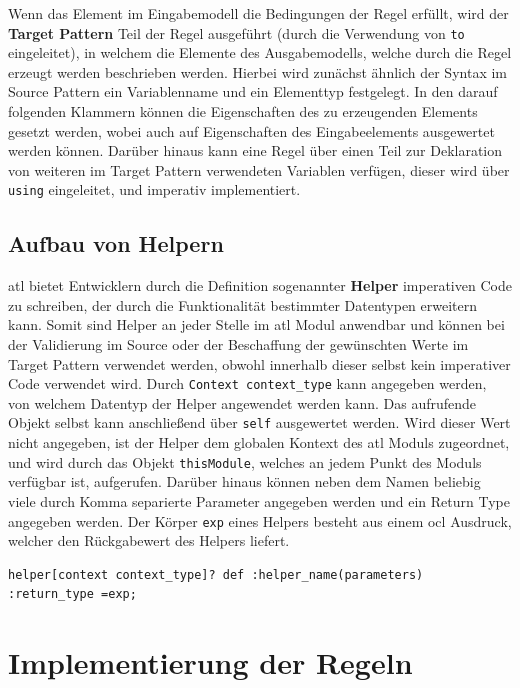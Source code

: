 \documentclass[
	oneside,  %
	ngerman, 
	final, 
	11pt, 
	a4paper, 
	1.1headlines, 
	headinclude=false, 
	footinclude=false, 
	mpinclude=false, 
	pagesize, 
	onecolumn, 
	titlepage, 
	parskip=half, 
	headsepline, 
	chapterprefix=false, 
	version=first, 
	listof=totoc, 
	bibliography=totoc, 
	toc=graduated, 
	fleqn
]{scrbook}
\begin{document}
Wenn das Element im Eingabemodell die Bedingungen der Regel erfüllt, wird der \textbf{Target Pattern} Teil der Regel ausgeführt (durch die Verwendung von \texttt{to} eingeleitet), in welchem die Elemente des Ausgabemodells, welche durch die Regel erzeugt werden beschrieben werden. Hierbei wird zunächst ähnlich der Syntax im Source Pattern ein Variablenname und ein Elementtyp festgelegt. In den darauf folgenden Klammern können die Eigenschaften des zu erzeugenden Elements gesetzt werden, wobei auch auf Eigenschaften des Eingabeelements ausgewertet werden können. Darüber hinaus kann eine Regel über einen Teil zur Deklaration von weiteren im Target Pattern verwendeten Variablen verfügen, dieser wird über \texttt{using} eingeleitet, und imperativ implementiert.
\cite{ATLDoc}
\subsection{Aufbau von Helpern}
\ac{atl} bietet Entwicklern durch die Definition sogenannter \textbf{Helper} imperativen Code zu schreiben, der durch die Funktionalität bestimmter Datentypen erweitern kann. Somit sind Helper an jeder Stelle im \ac{atl} Modul anwendbar und können bei der Validierung im Source oder der Beschaffung der gewünschten Werte im Target Pattern verwendet werden, obwohl innerhalb dieser selbst kein imperativer Code verwendet wird. Durch \texttt{Context context\_type} kann angegeben werden, von welchem Datentyp der Helper angewendet werden kann. Das aufrufende Objekt selbst kann anschließend über \texttt{self} ausgewertet werden. Wird dieser Wert nicht angegeben, ist der Helper dem globalen Kontext des \ac{atl} Moduls zugeordnet, und wird durch das Objekt \texttt{thisModule}, welches an jedem Punkt des Moduls verfügbar ist, aufgerufen. Darüber hinaus können neben dem Namen beliebig viele durch Komma separierte Parameter angegeben werden und ein Return Type angegeben werden. Der Körper \texttt{exp} eines Helpers besteht aus einem \ac{ocl} Ausdruck, welcher den Rückgabewert des Helpers liefert. \cite{ATLDoc}
\begin{lstlisting}[caption={Schema zur Deklaration von Helpern \cite{ATLDoc} },captionpos=b,label=Quellcode:HelperSchema] 
helper[context context_type]? def :helper_name(parameters) :return_type =exp;\end{lstlisting}
\section{Implementierung der Regeln}
\end{document}
